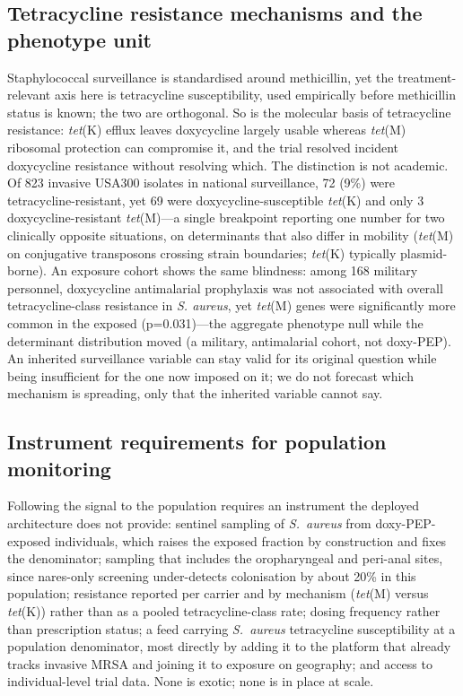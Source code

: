 \documentclass[12pt,a4paper]{article}
\newcommand{\sa}{\emph{S.~aureus}}
\begin{document}
\subsection*{Tetracycline resistance mechanisms and the phenotype unit}
Staphylococcal surveillance is standardised around methicillin, yet the
treatment-relevant axis here is tetracycline susceptibility, used empirically
before methicillin status is known; the two are orthogonal. So is the molecular
basis of tetracycline resistance: \emph{tet}(K) efflux leaves doxycycline largely
usable whereas \emph{tet}(M) ribosomal protection can compromise it, and the trial
resolved incident doxycycline resistance without resolving
which.\cite{liu2011,grossman2016} The distinction is not academic. Of 823 invasive
USA300 isolates in national surveillance, 72 (9\%) were tetracycline-resistant,
yet 69 were doxycycline-susceptible \emph{tet}(K) and only 3 doxycycline-resistant
\emph{tet}(M)\cite{mcdougal2010}---a single breakpoint reporting one number for
two clinically opposite situations, on determinants that also differ in mobility
(\emph{tet}(M) on conjugative transposons crossing strain
boundaries;\cite{roberts2011} \emph{tet}(K) typically plasmid-borne\cite{han2007}).
An exposure cohort shows the same blindness: among 168 military personnel,
doxycycline antimalarial prophylaxis was not associated with overall
tetracycline-class resistance in \emph{S. aureus}, yet \emph{tet}(M) genes were
significantly more common in the exposed (p=0.031)\cite{mende2016}---the aggregate
phenotype null while the determinant distribution moved (a military, antimalarial
cohort, not doxy-PEP). An inherited surveillance variable can stay valid for its
original question while being insufficient for the one now imposed on it; we do
not forecast which mechanism is spreading, only that the inherited variable cannot
say.

\subsection*{Instrument requirements for population monitoring}
Following the signal to the population requires an instrument the deployed
architecture does not provide: sentinel sampling of \sa{} from doxy-PEP-exposed
individuals, which raises the exposed fraction by construction and fixes the
denominator; sampling that includes the oropharyngeal and peri-anal sites, since
nares-only screening under-detects colonisation by about 20\% in this
population\cite{kyaw2012}; resistance reported per carrier and by mechanism
(\emph{tet}(M) versus \emph{tet}(K)) rather than as a pooled tetracycline-class
rate; dosing frequency rather than prescription status; a feed carrying \sa{} tetracycline
susceptibility at a population denominator, most directly by adding it to the
platform that already tracks invasive MRSA and joining it to exposure on
geography; and access to individual-level trial data. None is exotic; none
is in place at scale.
\end{document}
